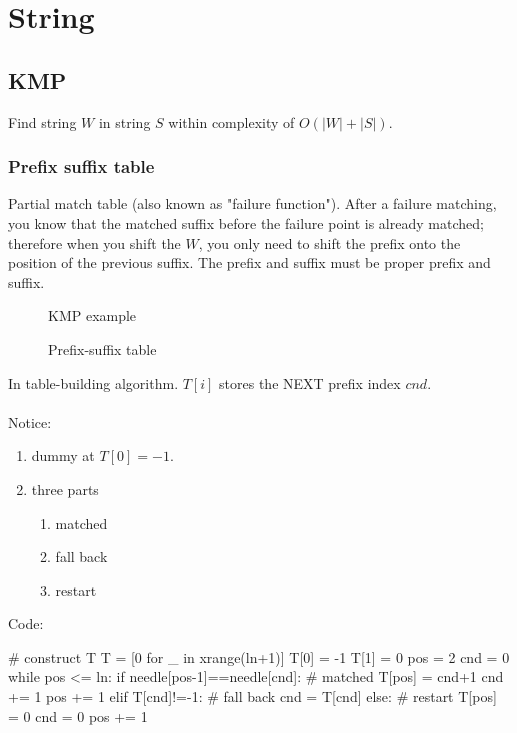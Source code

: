 \chapter{String}


\section{KMP}
Find string $W$ in string $S$ within complexity of $O(|W|+|S|)$.
\subsection{Prefix suffix table}
Partial match table (also known as "failure function"). After a failure matching, you know that the matched suffix before the failure point is already matched; therefore when you shift the $W$, you only need to shift the prefix onto the position of the previous suffix. The prefix and suffix must be proper prefix and suffix.
\begin{figure}[hbtp]
\centering
{}
\caption{KMP example}
\label{fig:kmp_presuffix}
\end{figure}

\begin{figure}[hbtp]
\centering
{}
\caption{Prefix-suffix table}
\label{fig:kmp_table}
\end{figure}
In table-building algorithm. $T[i]$ stores the NEXT prefix index $cnd$.\\
\\
Notice:
\begin{enumerate}
\item dummy at $T[0]=-1$.
\item three parts
\begin{enumerate}
\item matched
\item fall back
\item restart 
\end{enumerate}
\end{enumerate}
Code:
\begin{python}
# construct T
T = [0 for _ in xrange(ln+1)]
T[0] = -1
T[1] = 0
pos = 2
cnd = 0  
while pos <= ln:
    if needle[pos-1]==needle[cnd]:  # matched
        T[pos] = cnd+1
        cnd += 1
        pos += 1
    elif T[cnd]!=-1:  # fall back 
        cnd = T[cnd]
    else:  # restart 
        T[pos] = 0
        cnd = 0
        pos += 1

\end{python}


